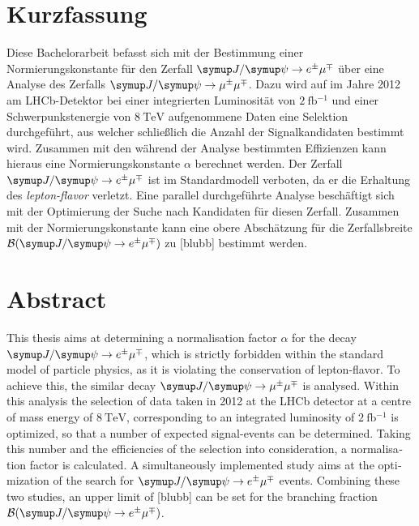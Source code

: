 \thispagestyle{plain}

\section*{Kurzfassung}
Diese Bachelorarbeit befasst sich mit der Bestimmung einer Normierungskonstante für den Zerfall $\signal$ über eine Analyse des Zerfalls $\kontroll$. Dazu wird auf im Jahre 2012 am LHCb-Detektor bei einer integrierten Luminosität von $\SI{2}{\femto\barn^{-1}}$ und einer Schwerpunkstenergie von $\SI{8}{\tera\electronvolt}$ aufgenommene Daten eine Selektion durchgeführt, aus welcher schließlich die Anzahl der Signalkandidaten bestimmt wird. Zusammen mit den während der Analyse bestimmten Effizienzen kann hieraus eine Normierungskonstante $\alpha$ berechnet werden. Der Zerfall $\signal$ ist im Standardmodell verboten, da er die Erhaltung des \textit{lepton-flavor} verletzt. Eine parallel durchgeführte Analyse beschäftigt sich mit der Optimierung der Suche nach Kandidaten für diesen Zerfall. Zusammen mit der Normierungskonstante kann eine obere Abschätzung für die Zerfallsbreite $\mathcal{B}(\signal)$ zu [blubb] bestimmt werden.

\section*{Abstract}
\begin{english}
This thesis aims at determining a normalisation factor $\alpha$ for the decay $\signal$, which is strictly forbidden within the standard model of particle physics, as it is violating the conservation of lepton-flavor. To achieve this, the similar decay $\kontroll$ is analysed. Within this analysis the selection of data taken in 2012 at the LHCb detector at a centre of mass energy of $\SI{8}{\tera\electronvolt}$, corresponding to an integrated luminosity of $\SI{2}{\femto\barn^{-1}}$ is optimized, so that a number of expected signal-events can be determined. Taking this number and the efficiencies of the selection into consideration, a normalisation factor is calculated. A simultaneously implemented study aims at the optimization of the search for $\signal$ events. Combining these two studies, an upper limit of [blubb] can be set for the branching fraction $\mathcal{B}(\signal)$.
\end{english}
